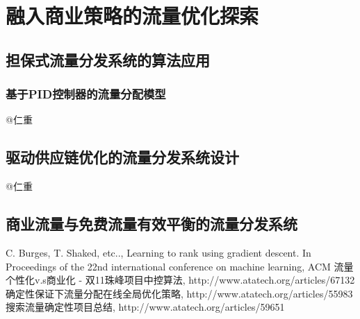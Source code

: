 
\chapter{ 融入商业策略的流量优化探索 }
\thispagestyle{empty}

\setlength{\fboxrule}{0pt}\setlength{\fboxsep}{0cm}
\noindent\shadowbox{
\begin{tcolorbox}[arc=0mm,colback=lightblue,colframe=darkblue,title=学习目标与要求]

\end{tcolorbox}}
\setlength{\fboxrule}{1pt}\setlength{\fboxsep}{4pt} 

\section{担保式流量分发系统的算法应用}
\subsection {基于PID控制器的流量分配模型}
@仁重 

\section{驱动供应链优化的流量分发系统设计} 
@仁重

\section{商业流量与免费流量有效平衡的流量分发系统} 


\begin{thebibliography}{99}
 C. Burges, T. Shaked, etc.., Learning to rank 
using gradient descent. In Proceedings of the 22nd international 
conference on machine learning, ACM
 流量个性化v.s商业化 - 双11珠峰项目中控算法, http://www.atatech.org/articles/67132
 确定性保证下流量分配在线全局优化策略, http://www.atatech.org/articles/55983
 搜索流量确定性项目总结, http://www.atatech.org/articles/59651
\end{thebibliography}

 
